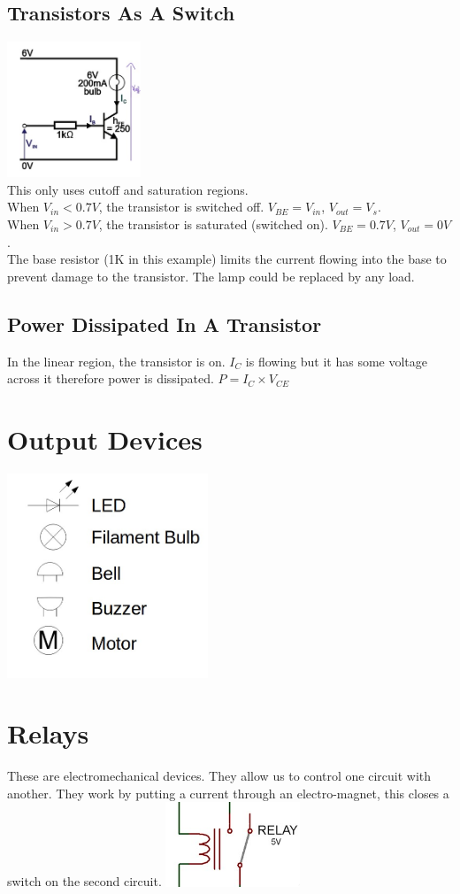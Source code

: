\documentclass[a4paper,11pt, twocolumn]{article}
\begin{document}
\subsection{Transistors As A Switch}
\includegraphics[width=0.3\textwidth]{bjt as switch.jpg}\\
This only uses cutoff and saturation regions. \\
When $V_{in}<0.7V$, the transistor is switched off. $V_{BE}=V_{in}$, $V_{out} = V_{s}$.\\
When $V_{in}>0.7V$, the transistor is saturated (switched on). $V_{BE}=0.7V$, $V_{out} = 0V$.\\
The base resistor (1K in this example) limits the current flowing into the base to prevent damage to the transistor. The lamp could be replaced by any load.
\subsection{Power Dissipated In A Transistor}
In the linear region, the transistor is on. $I_C$ is flowing but it has some voltage across it therefore power is dissipated. $\displaystyle P=I_{C}\times V_{CE}$

\section{Output Devices}
\includegraphics[width=0.45\textwidth]{outputs.jpg}

\section{Relays}
These are electromechanical devices. They allow us to control one circuit with another. They work by putting a current through an electro-magnet, this closes a switch on the second circuit.
\includegraphics[width=0.3\textwidth]{relay.jpg}
\end{document}
